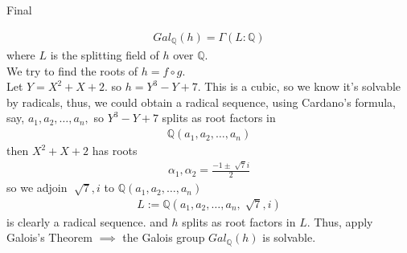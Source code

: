 \documentclass{article}
\begin{document}
\maketitle
Final
\pagebreak

\begin{homeworkProblem}
    \begin{align}
        Gal_{\mathbb{Q}}(h) = \Gamma(L:\mathbb{Q}) 
    \end{align}
    where $L$ is the splitting field of $h$ over $\mathbb{Q}$.\\
    We try to find the roots of $h = f \circ g$.\\
    Let $Y = X^2 + X + 2$. so $h = Y^3 - Y + 7$. 
    This is a cubic, so we know it's solvable by 
    radicals, thus, we could obtain a radical sequence,
    using Cardano's formula, say, $a_1, a_2, \ldots, a_n,$
    so $Y^3 - Y + 7$ splits as root factors in 
    \begin{align}
        \mathbb{Q}(a_1, a_2, \ldots, a_n)
    \end{align}
    then $X^2 + X + 2$ has roots
    \begin{align}
        \alpha_1, \alpha_2 = \frac{ -1 \pm \sqrt[]{7} i  }{ 2 }
    \end{align}
    so we adjoin $\sqrt[]{7}, i$ to $\mathbb{Q}(a_1, a_2, \ldots, a_n)$
    \begin{align}
        L := \mathbb{Q}(a_1, a_2, \ldots, a_n, \sqrt[]{7}, i)
    \end{align}
    is clearly a radical sequence. 
    and $h$ splits as root factors in $L$.
    Thus, apply Galois's Theorem $\implies$
    the Galois group $Gal_{\mathbb{Q}}(h)$ is solvable.
    
    

\end{homeworkProblem}

\pagebreak
\end{document}
